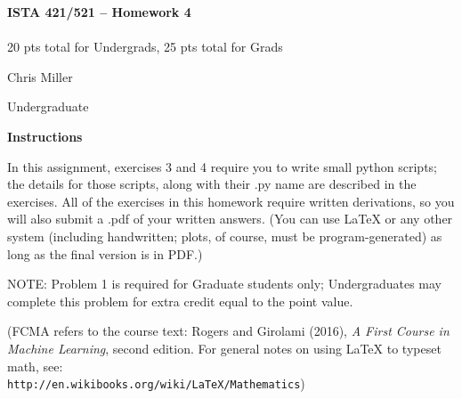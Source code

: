 \documentclass[10pt]{article}
\newcommand{\latex}{\LaTeX\xspace}
\begin{document}
\begin{center}
    {\Large {\bf ISTA 421/521 -- Homework 4}} \\
     \\
    20 pts total for Undergrads, 25 pts total for Grads\\
    
\end{center}

\begin{flushright}
Chris Miller %

Undergraduate %
\end{flushright}

\vspace{1cm}
{\Large {\bf Instructions}}

In this assignment, exercises 3 and 4 require you to write small python scripts; the details for those scripts, along with their .py name are described in the exercises.  All of the exercises in this homework require written derivations, so you will also submit a .pdf of your written answers.  (You can use \latex or any other system (including handwritten; plots, of course, must be program-generated) as long as the final version is in PDF.)


NOTE: Problem 1 is required for Graduate students only; Undergraduates may complete this problem for extra credit equal to the point value.

(FCMA refers to the course text: Rogers and Girolami (2016), {\em A First Course in Machine Learning}, second edition.  For general notes on using \latex to typeset math, see: \\{\tt http://en.wikibooks.org/wiki/LaTeX/Mathematics})
\vspace{.5cm}



\end{document}
